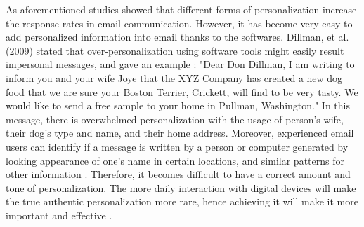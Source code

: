 As aforementioned studies showed that different forms of personalization increase the response rates in email communication. However, it has become very easy to add personalized information into email thanks to the softwares. Dillman, et al. (2009) stated that over-personalization using software tools might easily result impersonal messages, and gave an example \citep[page 237-238]{DillmanDonA.SmythJoleneD.Christian2009}: "Dear Don Dillman, I am writing to inform you and your wife Joye that the XYZ Company has created a new dog food that we are sure your Boston Terrier, Crickett, will find to be very tasty. We would like to send a free sample to your home in Pullman, Washington." In this message, there is overwhelmed personalization with the usage of person's wife, their dog's type and name, and their home address. Moreover, experienced email users can identify if a message is written by a person or computer generated by looking appearance of one's name in certain locations, and similar patterns for other information \citep[page 272]{DillmanDonA.SmythJoleneD.Christian2009}. Therefore, it becomes difficult to have a correct amount and tone of personalization. The more daily interaction with digital devices will make the true authentic personalization more rare, hence achieving it will make it more important and effective \citep[page 238]{DillmanDonA.SmythJoleneD.Christian2009}.


 


